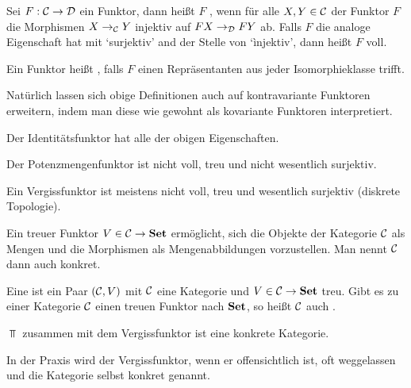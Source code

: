 \documentclass{book}
\begin{document}
\begin{definition}
    Sei $F:\mathcal{C}\rightarrow\mathcal{D}$ ein Funktor, dann heißt $F$ , wenn für alle $X,Y\in\mathcal{C}$ der Funktor $F$ die Morphismen $X\rightarrow_{\mathcal{C}} Y$ injektiv auf $FX\rightarrow_{\mathcal{D}} FY$ ab.
    Falls $F$ die analoge Eigenschaft hat mit `surjektiv' and der Stelle von `ìnjektiv', dann heißt $F$ voll.
\end{definition}

\begin{definition}
    Ein Funktor heißt , falls $F$ einen Repräsentanten aus jeder Isomorphieklasse trifft.
\end{definition}

Natürlich lassen sich obige Definitionen auch auf kontravariante Funktoren erweitern, indem man diese wie gewohnt als kovariante Funktoren interpretiert.

\begin{example}
    Der Identitätsfunktor hat alle der obigen Eigenschaften.
\end{example}

\begin{example}
    Der Potenzmengenfunktor ist nicht voll, treu und nicht wesentlich surjektiv.
\end{example}

\begin{example}
    Ein Vergissfunktor ist meistens nicht voll, treu und wesentlich surjektiv (diskrete Topologie).
\end{example}

\begin{remark}
    Ein treuer Funktor $V\in \mathcal{C}\rightarrow\mathbf{Set}$ ermöglicht, sich die Objekte der Kategorie $\mathcal{C}$ als Mengen und die Morphismen als Mengenabbildungen vorzustellen. Man nennt $\mathcal{C}$ dann auch konkret.
\end{remark}

\begin{definition}
    Eine  ist ein Paar $(\mathcal{C},V)$ mit $\mathcal{C}$ eine Kategorie und $V\in\mathcal{C}\rightarrow\mathbf{Set}$ treu. Gibt es zu einer Kategorie $\mathcal{C}$ einen treuen Funktor nach $\mathbf{Set}$, so heißt $\mathcal{C}$ auch .
\end{definition}

\begin{example}
    $\Top$ zusammen mit dem Vergissfunktor ist eine konkrete Kategorie.
\end{example}

\begin{remark}
    In der Praxis wird der Vergissfunktor, wenn er offensichtlich ist, oft weggelassen und die Kategorie selbst konkret genannt.
\end{remark}
\end{document}
